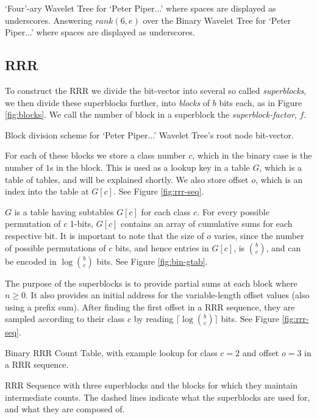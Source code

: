 			{`Four'-ary Wavelet Tree for `Peter Piper...' where spaces are 
			displayed as underscores.}
\clearpage
			{Answering $rank(6, e)$ over the Binary Wavelet Tree for `Peter
			Piper...' where spaces are displayed as underscores.}

\subsection{RRR}
To construct the RRR we divide the bit-vector into several so called 
\emph{superblocks}, we then divide these superblocks further, into 
\emph{blocks} of $b$ bits each, as in Figure \ref{fig:blocks}. We call the 
number of block in a superblock the \emph{superblock-factor}, $f$.

			{Block division scheme for `Peter Piper...' Wavelet Tree's root
			node bit-vector.}

For each of these blocks we store a class number $c$, which in the binary case 
is the number of  $1$s in the block. This is used as a lookup key in a table 
$G$, which is a table of tables, and will be explained shortly. We also store 
offset $o$, which is an index into the table at $G[c]$. See Figure 
\ref{fig:rrr-seq}.

$G$ is a table having subtables $G[c]$ for each class $c$. For every possible 
permutation of $c$ 1-bits, $G[c]$ contains an array of cumulative sums for each 
respective bit. It is important to note that the size of $o$ varies, since 
the number of possible permutations of $c$ bits, and hence entries in $G[c]$, is $b \choose c$, and can be encoded in $\log {b \choose c}$ bits. See Figure \ref{fig:bin-gtab}.

The purpose of the superblocks is to provide partial sums at each block where $n 
\ge 0$. It also provides an initial address for the variable-length offset 
values (also using a prefix sum). After finding the first offset in a RRR
sequence, they are sampled according to their class $c$ by reading $\lceil\log 
{b \choose c}\rceil$ bits. See Figure \ref{fig:rrr-seq}.

		{Binary RRR Count Table, with example lookup for class $c = 2$
		and offset $o = 3$ in a RRR sequence.}

		{RRR Sequence with three superblocks and the blocks for which they
		maintain intermediate counts. The dashed lines indicate what
		the superblocks are used for, and what they are composed of.}

